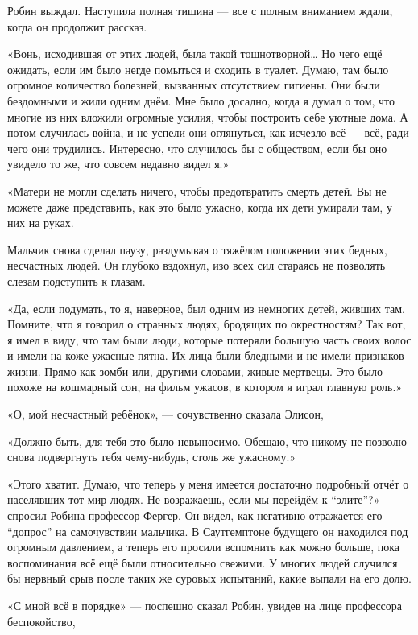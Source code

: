 \documentclass[a5paper, 9pt,
final, openany, twoside=true]{memoir}
\begin{document}
Робин выждал. Наступила полная тишина — все с полным вниманием ждали, когда он продолжит рассказ.

«Вонь, исходившая от этих людей, была такой тошнотворной… Но чего ещё ожидать, если им было негде помыться и сходить в туалет. Думаю, там было огромное количество болезней, вызванных отсутствием гигиены. Они были бездомными и жили одним днём. Мне было досадно, когда я думал о том, что многие из них вложили огромные усилия, чтобы построить себе уютные дома. А потом случилась война, и не успели они оглянуться, как исчезло всё — всё, ради чего они трудились. Интересно, что случилось бы с обществом, если бы оно увидело то же, что совсем недавно видел я.»

«Матери не могли сделать ничего, чтобы предотвратить смерть детей. Вы не можете даже представить, как это было ужасно, когда их дети умирали там, у них на руках.

Мальчик снова сделал паузу, раздумывая о тяжёлом положении этих бедных, несчастных людей. Он глубоко вздохнул, изо всех сил стараясь не позволять слезам подступить к глазам.

«Да, если подумать, то я, наверное, был одним из немногих детей, живших там. Помните, что я говорил о странных людях, бродящих по окрестностям? Так вот, я имел в виду, что там были люди, которые потеряли большую часть своих волос и имели на коже ужасные пятна. Их лица были бледными и не имели признаков жизни. Прямо как зомби или, другими словами, живые мертвецы. Это было похоже на кошмарный сон, на фильм ужасов, в котором я играл главную роль.»

«О, мой несчастный ребёнок», — сочувственно сказала Элисон,

«Должно быть, для тебя это было невыносимо. Обещаю, что никому не позволю снова подвергнуть тебя чему-нибудь, столь же ужасному.»

«Этого хватит. Думаю, что теперь у меня имеется достаточно подробный отчёт о населявших тот мир людях. Не возражаешь, если мы перейдём к ``элите''?» — спросил Робина профессор Фергер. Он видел, как негативно отражается его ``допрос'' на самочувствии мальчика. В Саутгемптоне будущего он находился под огромным давлением, а теперь его просили вспомнить как можно больше, пока воспоминания всё ещё были относительно свежими. У многих людей случился бы нервный срыв после таких же суровых испытаний, какие выпали на его долю.

«С мной всё в порядке» — поспешно сказал Робин, увидев на лице профессора беспокойство,
\end{document}
